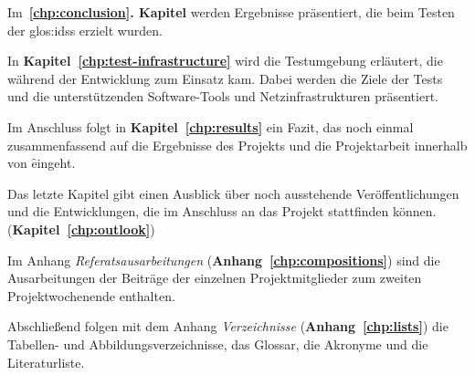 Im~\textbf{\ref{chp:conclusion}. Kapitel} werden Ergebnisse präsentiert, die
beim Testen der \glspl{glos:ids} erzielt wurden.

In \textbf{Kapitel~\ref{chp:test-infrastructure}} wird die Testumgebung erläutert,
die während der Entwicklung zum Einsatz kam. Dabei werden die Ziele
der Tests und die unterstützenden Software-Tools und
Netzinfrastrukturen präsentiert.

Im Anschluss folgt in \textbf{Kapitel~\ref{chp:results}} ein Fazit, das noch
einmal zusammenfassend auf die Ergebnisse des Projekts und die
Projektarbeit innerhalb von \f eingeht.

Das letzte Kapitel gibt einen Ausblick über noch ausstehende
Veröffentlichungen und die Entwicklungen, die im Anschluss an das
Projekt stattfinden können. (\textbf{Kapitel~\ref{chp:outlook}})

Im Anhang \textit{Referatsausarbeitungen}
(\textbf{Anhang~\ref{chp:compositions}}) sind die Ausarbeitungen der Beiträge
der einzelnen Projektmitglieder zum zweiten Projektwochenende enthalten.

Abschließend folgen mit dem Anhang \textit{Verzeichnisse}
(\textbf{Anhang~\ref{chp:lists}}) die Tabellen- und Abbildungsverzeichnisse,
das Glossar, die Akronyme und die Literaturliste.
